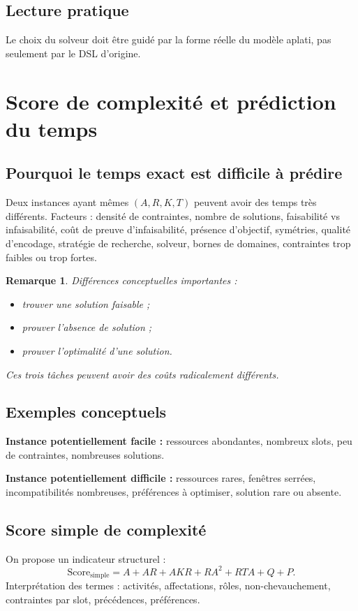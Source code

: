 \documentclass[12pt,a4paper]{article}
\newtheorem{remark}{Remarque}[section]
\begin{document}
\subsection{Lecture pratique}
Le choix du solveur doit être guidé par la forme réelle du modèle aplati, pas seulement par le DSL d'origine.

\section{Score de complexité et prédiction du temps}

\subsection{Pourquoi le temps exact est difficile à prédire}
Deux instances ayant mêmes $(A,R,K,T)$ peuvent avoir des temps très différents. Facteurs : densité de contraintes, nombre de solutions, faisabilité vs infaisabilité, coût de preuve d'infaisabilité, présence d'objectif, symétries, qualité d'encodage, stratégie de recherche, solveur, bornes de domaines, contraintes trop faibles ou trop fortes.

\begin{remark}
Différences conceptuelles importantes :
\begin{itemize}
  \item trouver une solution faisable ;
  \item prouver l'absence de solution ;
  \item prouver l'optimalité d'une solution.
\end{itemize}
Ces trois tâches peuvent avoir des coûts radicalement différents.
\end{remark}

\subsection{Exemples conceptuels}
\textbf{Instance potentiellement facile :} ressources abondantes, nombreux slots, peu de contraintes, nombreuses solutions.

\textbf{Instance potentiellement difficile :} ressources rares, fenêtres serrées, incompatibilités nombreuses, préférences à optimiser, solution rare ou absente.

\subsection{Score simple de complexité}
On propose un indicateur structurel :
\begin{equation}
\text{Score}_{\text{simple}} = A + AR + AKR + RA^2 + RTA + Q + P.
\end{equation}
Interprétation des termes : activités, affectations, rôles, non-chevauchement, contraintes par slot, précédences, préférences.
\end{document}
